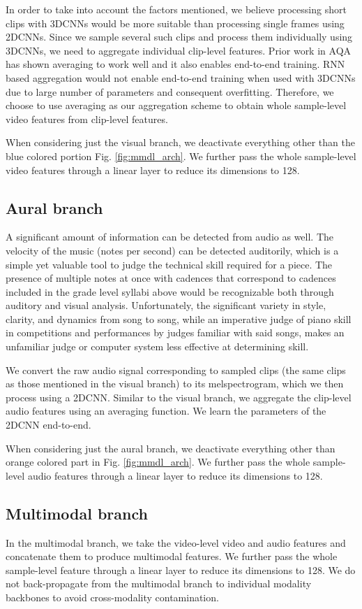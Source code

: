 \documentclass{article}
\begin{document}
In order to take into account the factors mentioned, we believe processing short clips with 3DCNNs would be more suitable than processing single frames using 2DCNNs. Since we sample several such clips and process them individually using 3DCNNs, we need to aggregate individual clip-level features. Prior work \cite{mtlaqa} in AQA has shown averaging to work well and it also enables end-to-end training. RNN based aggregation would not enable end-to-end training when used with 3DCNNs due to large number of parameters and consequent overfitting. Therefore, we choose to use averaging as our aggregation scheme to obtain whole sample-level video features from clip-level features.

When considering just the visual branch, we deactivate everything other than the blue colored portion Fig. \ref{fig:mmdl_arch}. We further pass the whole sample-level video features through a linear layer to reduce its dimensions to 128.

\subsection{Aural branch}
A significant amount of information can be detected from audio as well. The velocity of the music (notes per second) can be detected auditorily, which is a simple yet valuable tool to judge the technical skill required for a piece. The presence of multiple notes at once with cadences that correspond to cadences included in the grade level syllabi above would be recognizable both through auditory and visual analysis. Unfortunately, the significant variety in style, clarity, and dynamics from song to song, while an imperative judge of piano skill in competitions and performances by judges familiar with said songs, makes an unfamiliar judge or computer system less effective at determining skill.

We convert the raw audio signal corresponding to sampled clips (the same clips as those mentioned in the visual branch) to its melspectrogram, which we then process using a 2DCNN. Similar to the visual branch, we aggregate the clip-level audio features using an averaging function. We learn the parameters of the 2DCNN end-to-end. 

When considering just the aural branch, we deactivate everything other than orange colored part in Fig. \ref{fig:mmdl_arch}. We further pass the whole sample-level audio features through a linear layer to reduce its dimensions to 128.

\subsection{Multimodal branch}
In the multimodal branch, we take the video-level video and audio features and concatenate them to produce multimodal features. We further pass the whole sample-level feature through a linear layer to reduce its dimensions to 128. We do not back-propagate from the multimodal branch to individual modality backbones to avoid cross-modality contamination.
\end{document}
